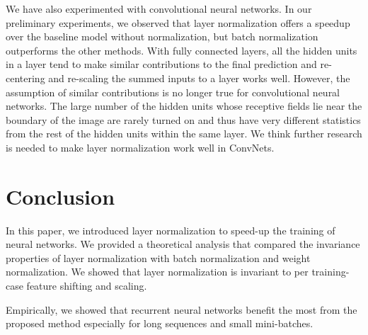 We have also experimented with convolutional neural networks. In our preliminary experiments, we observed that layer normalization offers a speedup over the baseline model without normalization, but batch normalization outperforms the other methods. With fully connected layers, all the hidden units in a layer tend to make similar contributions to the final prediction and re-centering and re-scaling the summed inputs to a layer works well.  However, the assumption of similar contributions is no longer true for convolutional neural networks. The large number of the hidden units whose receptive fields lie near the boundary of the image are rarely turned on and thus have very different statistics from the rest of the hidden units within the same layer. We think further research is needed to make layer normalization work well in ConvNets.

\section{Conclusion}
\label{sec:discussion}

In this paper, we introduced layer normalization to speed-up the  training of neural networks. We provided a theoretical analysis that compared the invariance properties of layer normalization with batch normalization and weight normalization. We showed that layer normalization is invariant to per training-case feature shifting and scaling.

Empirically, we showed that recurrent neural networks benefit the most from the proposed method especially for long sequences and small mini-batches. 


